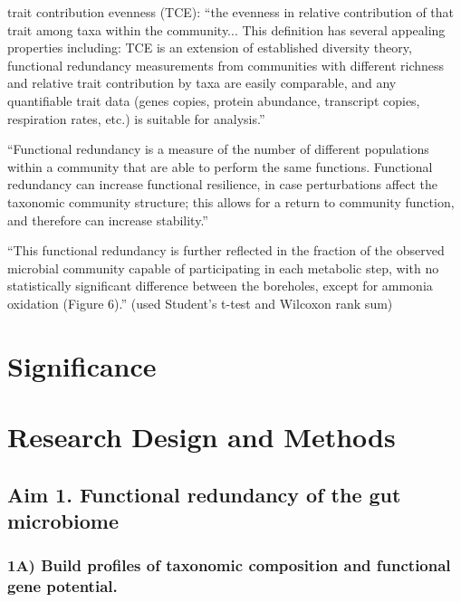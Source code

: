 \documentclass[11pt]{article}
\begin{document}
trait contribution evenness (TCE): ``the evenness in relative contribution of that trait among taxa within the community... This definition has several appealing properties including: TCE is an extension of established diversity theory, functional redundancy measurements from communities with different richness and relative trait contribution by taxa are easily comparable, and any quantifiable trait data (genes copies, protein abundance, transcript copies, respiration rates, etc.) is suitable for analysis.'' \cite{royalty_quantitative_2020}

``Functional redundancy is a measure of the number of different populations within a community that are able to perform the same functions. Functional redundancy can increase functional resilience, in case perturbations affect the taxonomic community structure; this allows for a return to community function, and therefore can increase stability.'' \cite{heintz-buschart_human_2018}

``This functional redundancy is further reflected in the fraction of the observed microbial community capable of participating in each metabolic step, with no statistically significant difference between the boreholes, except for ammonia oxidation (Figure 6).'' (used Student's t-test and Wilcoxon rank sum) \cite{tully_dynamic_2018}

\section*{Significance} %


\section*{Research Design and Methods}

\subsection*{Aim 1. Functional redundancy of the gut microbiome}

\subsubsection*{1A) Build profiles of taxonomic composition and functional gene potential.}
\end{document}
